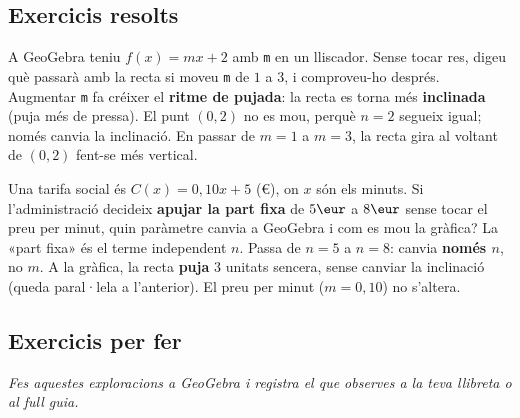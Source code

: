 \subsection{Exercicis resolts}

\begin{exresolt}
A GeoGebra teniu $f(x)=mx+2$ amb \texttt{m} en un lliscador. Sense tocar res, digeu
què passarà amb la recta si moveu \texttt{m} de $1$ a $3$, i comproveu-ho després.
\solucio
Augmentar \texttt{m} fa créixer el \textbf{ritme de pujada}: la recta es torna més
\textbf{inclinada} (puja més de pressa). El punt $(0,2)$ no es mou, perquè $n=2$
segueix igual; només canvia la inclinació. En passar de $m=1$ a $m=3$, la recta
gira al voltant de $(0,2)$ fent-se més vertical.
\end{exresolt}

\begin{exresolt}
Una tarifa social és $C(x)=0,10x+5$ (€), on $x$ són els minuts. Si l'administració
decideix \textbf{apujar la part fixa} de $5\eur$ a $8\eur$ sense tocar el preu per
minut, quin paràmetre canvia a GeoGebra i com es mou la gràfica?
\solucio
La «part fixa» és el terme independent $n$. Passa de $n=5$ a $n=8$: canvia
\textbf{només $n$}, no $m$. A la gràfica, la recta \textbf{puja} $3$ unitats sencera,
sense canviar la inclinació (queda paral·lela a l'anterior). El preu per minut
($m=0,10$) no s'altera.
\end{exresolt}

\subsection{Exercicis per fer}

\noindent\textit{Fes aquestes exploracions a GeoGebra i registra el que observes a la
teva llibreta o al full guia.}

